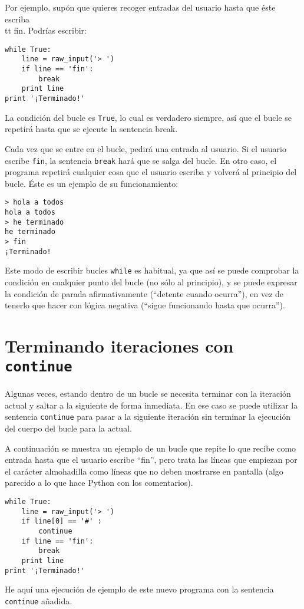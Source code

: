 Por ejemplo, supón que quieres recoger entradas del usuario hasta que
éste escriba {\\tt fin}. Podrías escribir:

\beforeverb
\begin{verbatim}
while True:
    line = raw_input('> ')
    if line == 'fin':
        break
    print line
print '¡Terminado!'
\end{verbatim}
\afterverb
%
La condición del bucle es {\tt True}, lo cual es verdadero siempre, así que
el bucle se repetirá hasta que se ejecute la sentencia break.

Cada vez que se entre en el bucle, pedirá una entrada al usuario.
Si el usuario escribe {\tt fin}, la sentencia {\tt break} hará que se
salga del bucle. En otro caso, el programa repetirá cualquier cosa que el usuario
escriba y volverá al principio del bucle. Éste es un ejemplo de su funcionamiento:

\beforeverb
\begin{verbatim}
> hola a todos
hola a todos
> he terminado
he terminado
> fin
¡Terminado!
\end{verbatim}
\afterverb
%
Este modo de escribir bucles {\tt while} es habitual, ya que
así se puede comprobar la condición en cualquier punto del
bucle (no sólo al principio), y se puede expresar la condición de parada
afirmativamente (``detente cuando ocurra''), en vez de tenerlo que hacer con lógica negativa
(``sigue funcionando hasta que ocurra'').

\section{Terminando iteraciones con {\tt continue}}

Algunas veces, estando dentro de un bucle se necesita
terminar con la iteración actual y saltar a la siguiente de forma inmediata.
En ese caso se puede utilizar la sentencia
{\tt continue} para pasar a la siguiente iteración sin terminar
la ejecución del cuerpo del bucle para la actual.

A continuación se muestra un ejemplo de un bucle que repite lo que recibe como entrada hasta que
el usuario escribe ``fin'', pero trata las líneas que empiezan por el carácter almohadilla
como líneas que no deben mostrarse en pantalla (algo parecido a lo que hace Python con los comentarios).

\beforeverb
\begin{verbatim}
while True:
    line = raw_input('> ')
    if line[0] == '#' :
        continue
    if line == 'fin':
        break
    print line
print '¡Terminado!'
\end{verbatim}
\afterverb
%
He aquí una ejecución de ejemplo de este nuevo programa con la sentencia {\tt continue} añadida.

